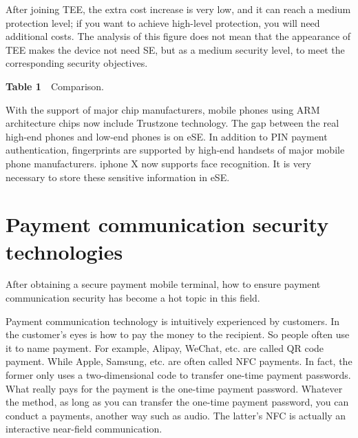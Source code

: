 \documentclass[journal]{IEEEtran}
\begin{document}
After joining TEE, the extra cost increase is very low, and it can reach a medium protection level; if you want to achieve high-level protection, you will need additional costs. The analysis of this figure does not mean that the appearance of TEE makes the device not need SE, but as a medium security level, to meet the corresponding security objectives.
\\
\begin{center}
\textbf{Table 1}~~Comparison.\\
\end{center}


With the support of major chip manufacturers, mobile phones using ARM architecture chips now include Trustzone technology. The gap between the real high-end phones and low-end phones is on eSE. In addition to PIN payment authentication, fingerprints are supported by high-end handsets of major mobile phone manufacturers. iphone X now supports face recognition. It is very necessary to store these sensitive information in eSE.

\section{Payment communication security technologies}
After obtaining a secure payment mobile terminal, how to ensure payment communication security has become a hot topic in this field.

Payment communication technology is intuitively experienced by customers. In the customer's eyes is how to pay the money to the recipient. So people often use it to name payment. For example, Alipay, WeChat, etc. are called QR code payment. While Apple, Samsung, etc. are often called NFC payments. In fact, the former only uses a two-dimensional code to transfer one-time payment passwords. What really pays for the payment is the one-time payment password. Whatever the method, as long as you can transfer the one-time payment password, you can conduct a payments, another way such as audio. The latter's NFC is actually an interactive near-field communication.
\end{document}
